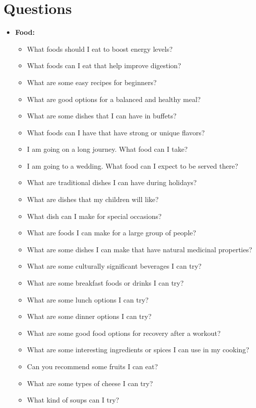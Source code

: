 \section{Questions}
\label{tab:que_list} 

\begin{itemize}
  \item \textbf{Food:}
  \begin{itemize}
    \item What foods should I eat to boost energy levels?
    \item What foods can I eat that help improve digestion?
    \item What are some easy recipes for beginners?
    \item What are good options for a balanced and healthy meal?
    \item What are some dishes that I can have in buffets?
    \item What foods can I have that have strong or unique flavors?
    \item I am going on a long journey. What food can I take?
    \item I am going to a wedding. What food can I expect to be served there?
    \item What are traditional dishes I can have during holidays?
    \item What are dishes that my children will like?
    \item What dish can I make for special occasions?
    \item What are foods I can make for a large group of people?
    \item What are some dishes I can make that have natural medicinal properties?
    \item What are some culturally significant beverages I can try?
    \item What are some breakfast foods or drinks I can try?
    \item What are some lunch options I can try?
    \item What are some dinner options I can try?
    \item What are some good food options for recovery after a workout?
    \item What are some interesting ingredients or spices I can use in my cooking?
    \item Can you recommend some fruits I can eat?
    \item What are some types of cheese I can try?
    \item What kind of soups can I try?

\end{itemize}
\end{itemize}
